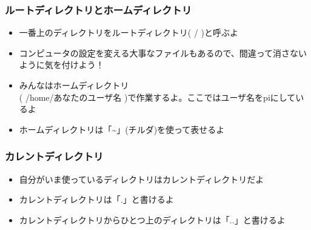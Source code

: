 \begin{frame}
    \frametitle{ルートディレクトリとホームディレクトリ}
    \begin{minipage}{0.45\hsize}
        \footnotesize
        \centering
        
        \begin{itemize}
            \item 一番上のディレクトリをルートディレクトリ( / )と呼ぶよ
            \item コンピュータの設定を変える大事なファイルもあるので、間違って消さないように気を付けよう！
        \end{itemize}
    \end{minipage}
    \begin{minipage}{0.45\hsize}
        \footnotesize
        \centering
        
        \begin{itemize}
            \item みんなはホームディレクトリ\\( /home/あなたのユーザ名 )で作業するよ。ここではユーザ名をpiにしているよ
            \item ホームディレクトリは「\textasciitilde」(チルダ)を使って表せるよ
        \end{itemize}
    \end{minipage}
\end{frame}

\begin{frame}
    \frametitle{カレントディレクトリ}
    \begin{itemize}
        \item 自分がいま使っているディレクトリはカレントディレクトリだよ
        \item カレントディレクトリは「.」と書けるよ
        \item カレントディレクトリからひとつ上のディレクトリは「..」と書けるよ
    \end{itemize}
\end{frame}

